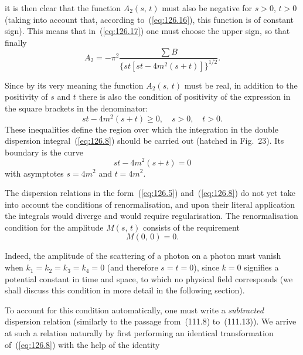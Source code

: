 
\noindent it is then clear that the function $A_2(s,\,t)$ must also be negative for $s > 0$, $t > 0$ (taking into account that, according to~(\ref{eq:126.16}), this function is of constant sign). This means that in~(\ref{eq:126.17}) one must choose the upper sign, so that finally
\begin{equation}
A_2 = -\pi^2 \frac{\sum B}{\{st[st - 4m^2(s+t)]\}^{1/2}}.
\label{eq:126.18}
\end{equation}

Since by its very meaning the function $A_2(s,\,t)$ must be real, in addition to the positivity of $s$ and $t$ there is also the condition of positivity of the expression in the square brackets in the denominator:
\begin{equation}
st - 4m^2(s + t) \geqslant 0,\quad s > 0,\quad t > 0.
\label{eq:126.19}
\end{equation}
These inequalities define the region over which the integration in the double dispersion integral~(\ref{eq:126.8}) should be carried out (hatched in Fig.~23). Its boundary is the curve
\[
st - 4m^2(s + t) = 0
\]
with asymptotes $s = 4m^2$ and $t = 4m^2$.


The dispersion relations in the form~(\ref{eq:126.5}) and~(\ref{eq:126.8}) do not yet take into account the conditions of renormalisation, and upon their literal application the integrals would diverge and would require regularisation. The renormalisation condition for the amplitude $M(s,\,t)$ consists of the requirement
\begin{equation}
M(0,\,0) = 0.
\label{eq:126.20}
\end{equation}

Indeed, the amplitude of the scattering of a photon on a photon must vanish when $k_1 = k_2 = k_3 = k_4 = 0$ (and therefore $s = t = 0$), since $k = 0$ signifies a potential constant in time and space, to which no physical field corresponds (we shall discuss this condition in more detail in the following section).

To account for this condition automatically, one must write a \emph{subtracted} dispersion relation (similarly to the passage from~(111.8) to~(111.13)). We arrive at such a relation naturally by first performing an identical transformation of~(\ref{eq:126.8}) with the help of the identity

